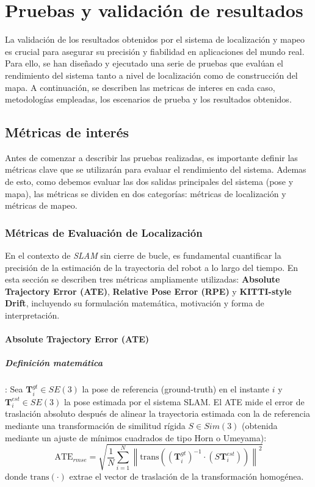 \documentclass[12pt, a4paper, twoside]{article}
\begin{document}
\section{Pruebas y validación de resultados}
La validación de los resultados obtenidos por el sistema de localización y mapeo es crucial para asegurar su precisión y fiabilidad en aplicaciones del mundo real. Para ello, se han diseñado y 
ejecutado una serie de pruebas que evalúan el rendimiento del sistema tanto a nivel de localización como de construcción del mapa. A continuación, se describen las metricas de interes en cada caso, 
metodologías empleadas, los escenarios de prueba y los resultados obtenidos.\newline

\subsection{Métricas de interés}
Antes de comenzar a describir las pruebas realizadas, es importante definir las métricas clave que se utilizarán para evaluar el rendimiento del sistema. Ademas de esto, como debemos evaluar las dos 
salidas principales del sistema (pose y mapa), las métricas se dividen en dos categorías: métricas de localización y métricas de mapeo.

\subsubsection{Métricas de Evaluación de Localización}

En el contexto de \textit{SLAM} sin cierre de bucle, es fundamental cuantificar 
la precisión de la estimación de la trayectoria del robot a lo largo del tiempo. 
En esta sección se describen tres métricas ampliamente utilizadas: 
\textbf{Absolute Trajectory Error (ATE)}, 
\textbf{Relative Pose Error (RPE)} y 
\textbf{KITTI-style Drift}, incluyendo su formulación matemática, motivación y forma de interpretación.

\paragraph{Absolute Trajectory Error (ATE)}

\subparagraph{Definición matemática}:
Sea $\mathbf{T}^{gt}_i \in SE(3)$ la pose de referencia (ground-truth) en el instante $i$ 
y $\mathbf{T}^{est}_i \in SE(3)$ la pose estimada por el sistema SLAM.
El ATE mide el error de traslación absoluto después de alinear la trayectoria estimada 
con la de referencia mediante una transformación de similitud rígida $S \in Sim(3)$
(obtenida mediante un ajuste de mínimos cuadrados de tipo Horn o Umeyama):
\[
\text{ATE}_{rmse} = 
\sqrt{\frac{1}{N}\sum_{i=1}^{N} 
\left\| 
\mathrm{trans}\!\left(
(\mathbf{T}^{gt}_i)^{-1} \cdot (S \mathbf{T}^{est}_i)
\right)
\right\|^2 }
\]
donde $\mathrm{trans}(\cdot)$ extrae el vector de traslación de la transformación homogénea.
\end{document}
